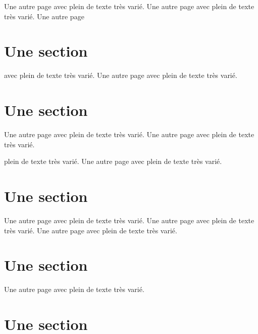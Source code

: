 \documentclass[11pt]{thesul}
\begin{document}
Une autre page avec plein de texte très varié.
Une autre page avec plein de texte très varié.
Une autre page


\section{Une section}

avec plein de texte très varié.
Une autre page avec plein de texte très varié.

\section{Une section}

Une autre page avec plein de texte très varié.
Une autre page avec plein de texte très varié.

\FrameChaptersInToc
{}

plein de texte très varié.
Une autre page avec plein de texte très varié.

\section{Une section}

Une autre page avec plein de texte très varié.
Une autre page avec plein de texte très varié.
Une autre page avec plein de texte très varié.

\section{Une section}

Une autre page avec plein de texte très varié.

\section{Une section}
\end{document}
